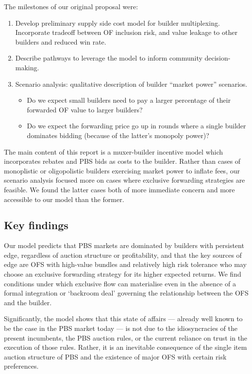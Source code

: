 The milestones of our original proposal were:
%
\begin{enumerate}
  \item 
    Develop preliminary supply side cost model for builder multiplexing. 
    Incorporate tradeoff between OF inclusion risk, and value leakage to other builders and reduced win rate.

  \item
    Describe pathways to leverage the model to inform community decision-making.

  \item
    Scenario analysis: qualitative description of builder ``market power'' scenarios.
    \begin{itemize}
      \item Do we expect small builders need to pay a larger percentage of their forwarded OF value to larger builders?
      \item Do we expect the forwarding price go up in rounds where a single builder dominates bidding (because of the latter's monopoly power)?
    \end{itemize}

\end{enumerate}

The main content of this report is a muxer-builder incentive model which incorporates rebates and PBS bids as costs to the builder.
%
Rather than cases of monoplistic or oligopolistic builders exercising market power to inflate fees, our scenario analysis focused more on cases where exclusive forwarding strategies are feasible.
%
We found the latter cases both of more immediate concern and more accessible to our model than the former.

\subsection*{Key findings}

Our model predicts that PBS markets are dominated by builders with persistent edge, regardless of auction structure or profitability, and that the key sources of edge are OFS with high-value bundles and relatively high risk tolerance who may choose an exclusive forwarding strategy for its higher expected returns.
%
We find conditions under which exclusive flow can materialise even in the absence of a formal integration or `backroom deal' governing the relationship between the OFS and the builder.

Significantly, the model shows that this state of affairs --- already well known to be the case in the PBS market today --- is not due to the idiosyncracies of the present incumbents, the PBS auction rules, or the current reliance on trust in the execution of those rules.
%
Rather, it is an inevitable consequence of the single item auction structure of PBS and the existence of major OFS with certain risk preferences.

